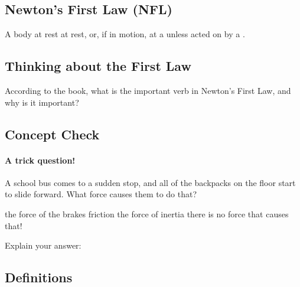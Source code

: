 \documentclass[10pt]{exam}
\begin{document}
\begin{Sbox}
  \begin{minipage}{6in}
    \subsection*{Newton's First Law (NFL)}

    A body at rest \fillin[remains][7em] at rest, or, if in motion, \fillin[remains][5em] at a  unless acted on by a .
  \end{minipage}
\end{Sbox}

\shadowbox{\TheSbox}

\vspace{1em}

\subsection*{Thinking about the First Law}

According to the book, what is the important verb in Newton's First Law, and why is it important?

\vspace{5em}


\vspace{1em}

\subsection*{Concept Check}

\paragraph{A trick question!} A school bus comes to a sudden stop, and all of the backpacks on the floor start to slide forward.  What force causes them to do that?

\begin{oneparcheckboxes}
  \choice the force of the brakes
  \choice friction
  \choice the force of inertia
  \correctchoice there is no force that causes that!
\end{oneparcheckboxes}

\hfill

Explain your answer:

\vspace{3em}

\subsection*{Definitions}
\end{document}

